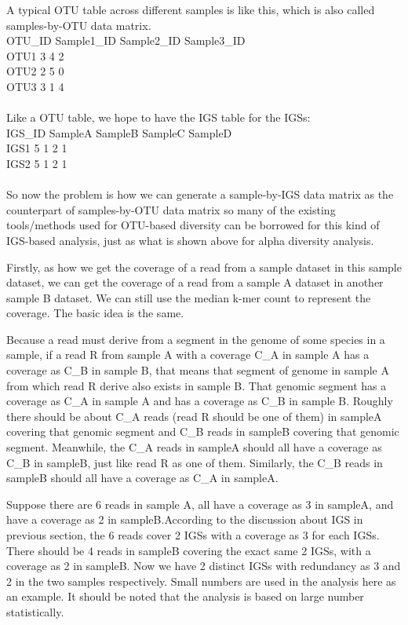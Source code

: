 A typical OTU table across different samples is like this, which is also 
called samples-by-OTU data matrix.
\\
OTU\_ID Sample1\_ID Sample2\_ID Sample3\_ID\\
OTU1   3          4          2\\
OTU2   2          5          0\\
OTU3   3          1          4\\
\\
    
Like a OTU table, we hope to have the IGS table for the IGSs:
\\
    IGS\_ID SampleA SampleB SampleC SampleD\\
    IGS1   5       1       2       1\\
    IGS2   5       1       2       1\\
\\
    
    So now the problem is how we can generate a sample-by-IGS data matrix as 
    the counterpart of samples-by-OTU data matrix so many of  the existing 
    tools/methods used for OTU-based diversity can be borrowed for this kind 
    of IGS-based analysis, just as what is shown above for alpha diversity analysis.

Firstly, as how we get the coverage of a read from a sample dataset in this 
sample dataset, we can get the coverage of a read from a sample A dataset in 
another sample B dataset. We can still use the median k-mer count to represent 
the coverage. The basic idea is the same. 

Because a read must derive from a segment in the genome of some species in a 
sample, if a read R from sample A with a coverage C\_A in sample A has a 
coverage as C\_B in sample B, that means that segment of genome in sample A 
from which read R derive also exists in sample B. That genomic segment has 
a coverage as C\_A in sample A and has a coverage as C\_B in sample B. 
Roughly there should be about C\_A reads (read R should be one of them) 
in sampleA covering that genomic segment and C\_B reads in sampleB covering 
that genomic segment. Meanwhile, the C\_A reads in sampleA should all have 
a coverage as C\_B in sampleB, just like read R as one of them. Similarly,
the C\_B reads in sampleB should all have a coverage as C\_A in sampleA.

Suppose there are 6 reads in sample A, all have a coverage as 3 in sampleA, 
and have a coverage as 2 in sampleB.According to the discussion about IGS in previous section, the 6 reads cover 
2 IGSs with a coverage as 3 for each IGSs. There should be 4 reads in sampleB 
covering the exact same 2 IGSs, with a coverage as 2 in sampleB.
Now we have 2 distinct IGSs with redundancy as 3 and 2 in the two samples 
respectively. Small numbers are used in the analysis here as an example. It should
be noted that the analysis is based on large number statistically.


